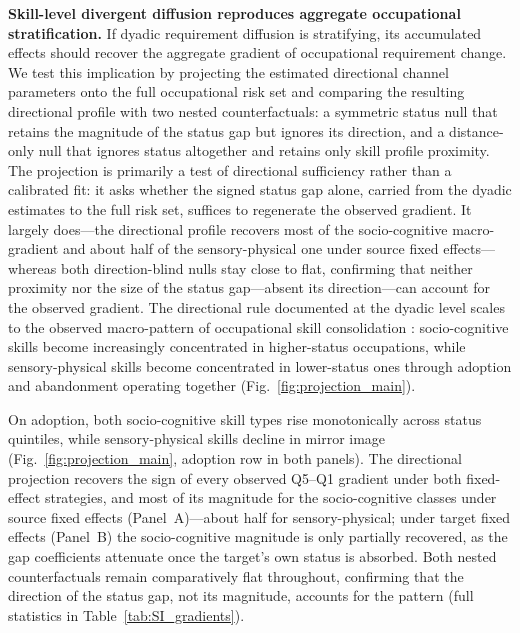 \documentclass[11pt, letterpaper]{article} %
\newcommand{\parencite}[1]{\cite{#1}}
\begin{document}
\textbf{Skill-level divergent diffusion reproduces aggregate occupational stratification.} If dyadic requirement diffusion is stratifying, its accumulated effects should recover the aggregate gradient of occupational requirement change. We test this implication by projecting the estimated directional channel parameters onto the full occupational risk set and comparing the resulting directional profile with two nested counterfactuals: a symmetric status null that retains the magnitude of the status gap but ignores its direction, and a distance-only null that ignores status altogether and retains only skill profile proximity. The projection is primarily a test of directional sufficiency rather than a calibrated fit: it asks whether the signed status gap alone, carried from the dyadic estimates to the full risk set, suffices to regenerate the observed gradient. It largely does---the directional profile recovers most of the socio-cognitive macro-gradient and about half of the sensory-physical one under source fixed effects---whereas both direction-blind nulls stay close to flat, confirming that neither proximity nor the size of the status gap---absent its direction---can account for the observed gradient. The directional rule documented at the dyadic level scales to the observed macro-pattern of occupational skill consolidation \parencite{blau_inequality_1977}: socio-cognitive skills become increasingly concentrated in higher-status occupations, while sensory-physical skills become concentrated in lower-status ones through adoption and abandonment operating together (Fig.~\ref{fig:projection_main}).

On adoption, both socio-cognitive skill types rise monotonically across status quintiles, while sensory-physical skills decline in mirror image (Fig.~\ref{fig:projection_main}, adoption row in both panels). The directional projection recovers the sign of every observed Q5--Q1 gradient under both fixed-effect strategies, and most of its magnitude for the socio-cognitive classes under source fixed effects (Panel~A)---about half for sensory-physical; under target fixed effects (Panel~B) the socio-cognitive magnitude is only partially recovered, as the gap coefficients attenuate once the target's own status is absorbed. Both nested counterfactuals remain comparatively flat throughout, confirming that the direction of the status gap, not its magnitude, accounts for the pattern (full statistics in Table~\ref{tab:SI_gradients}).
\end{document}
